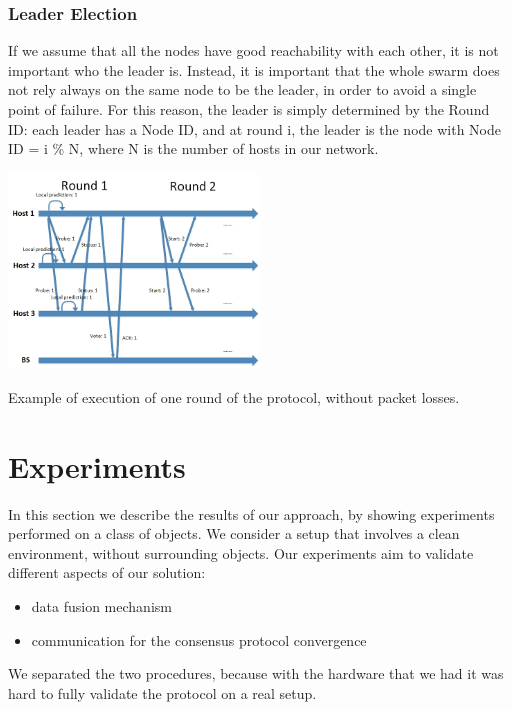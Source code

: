 \documentclass[10pt,conference,compsocconf]{IEEEtran}
\begin{document}
\begin{enumerate}
\subsubsection*{Leader Election}
If we assume that all the nodes have good reachability with each other, it is not important who the leader is. Instead, it is important that the whole swarm does not rely always on the same node to be the leader, in order to avoid a single point of failure. For this reason, the leader is simply determined by the Round ID: each leader has a Node ID, and at round i, the leader is the node with Node ID = i \% N, where N is the number of hosts in our network.
\begin{center}
	\captionsetup{type=figure}
	\includegraphics[width=0.5\textwidth]{img/temporal_sketch.jpg}
	\caption {Example of execution of one round of the protocol, without packet losses.}
	\label{fig:temporal_sketch}
\end{center}
\section{Experiments}
In this section we describe the results of our approach, by showing experiments performed on a class of objects.
We consider a setup that involves a clean environment, without surrounding objects.
Our experiments aim to validate different aspects of our solution:
\begin{itemize}
\item data fusion mechanism
\item communication for the consensus protocol convergence
\end{itemize}
We separated the two procedures, because with the hardware that we had it was hard to fully validate the protocol on a real setup.

\end{enumerate}
\end{document}
